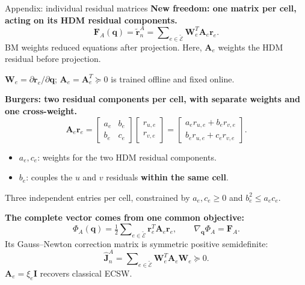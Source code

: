 \documentclass[aspectratio=169]{beamer}
\newcommand{\vect}[1]{\boldsymbol{#1}}
\newcommand{\matr}[1]{\boldsymbol{#1}}
\begin{document}
\begin{frame}[t]{Appendix: individual residual matrices}
\hypertarget{bmecsw-competing-proposals}{}
\fontsize{9}{10.5}\selectfont
\setlength{\parskip}{0pt}
\setlength{\abovedisplayskip}{1pt}
\setlength{\belowdisplayskip}{1pt}
\setlength{\abovedisplayshortskip}{1pt}
\setlength{\belowdisplayshortskip}{1pt}
\textbf{New freedom: one matrix per cell, acting on its HDM residual components.}
\[
  \vect{F}_A(\vect{q})=\widetilde{\vect{r}}_n^A
  =\sum\nolimits_{e\in\widetilde{\mathcal E}}\matr{W}_e^T\matr{A}_e\vect{r}_e.
\]
BM weights reduced equations after projection. Here, $\matr{A}_e$ weights the HDM residual before projection.\par
$\matr{W}_e=\partial\vect{r}_e/\partial\vect{q}$; $\matr{A}_e=\matr{A}_e^T\succeq0$ is trained offline and fixed online.\par
\vspace{2pt}
\textbf{Burgers: two residual components per cell, with separate weights and one cross-weight.}
\[
  \matr{A}_e\vect{r}_e
  =\begin{bmatrix}a_e&b_e\\b_e&c_e\end{bmatrix}
   \begin{bmatrix}r_{u,e}\\r_{v,e}\end{bmatrix}
  =\begin{bmatrix}
    a_e r_{u,e}+b_e r_{v,e}\\
    b_e r_{u,e}+c_e r_{v,e}
   \end{bmatrix}.
\]
\begin{itemize}
\setlength{\itemsep}{0pt}
\setlength{\topsep}{0pt}
\item $a_e,c_e$: weights for the two HDM residual components.
\item $b_e$: couples the $u$ and $v$ residuals \textbf{within the same cell}.
\end{itemize}
{\fontsize{8}{9.5}\selectfont Three independent entries per cell, constrained by $a_e,c_e\geq0$ and $b_e^2\leq a_ec_e$.}\par
\vspace{2pt}
\textbf{The complete vector comes from one common objective:}
\[
  \Phi_A(\vect{q})=\tfrac12\sum\nolimits_{e\in\widetilde{\mathcal E}}
    \vect{r}_e^T\matr{A}_e\vect{r}_e,
  \qquad \nabla_{\vect{q}}\Phi_A=\vect{F}_A.
\]
Its Gauss--Newton correction matrix is symmetric positive semidefinite:
\[
  \widehat{\matr{J}}_n^A
  =\sum\nolimits_{e\in\widetilde{\mathcal E}}\matr{W}_e^T\matr{A}_e\matr{W}_e\succeq0.
\]
$\matr{A}_e=\xi_e\matr{I}$ recovers classical ECSW.\par
\vfill\hfill
\hyperlink{bmecsw-grouped-proposal}{}
\quad\hyperlink{bmecsw-conclusions}{}
\end{frame}
\end{document}
